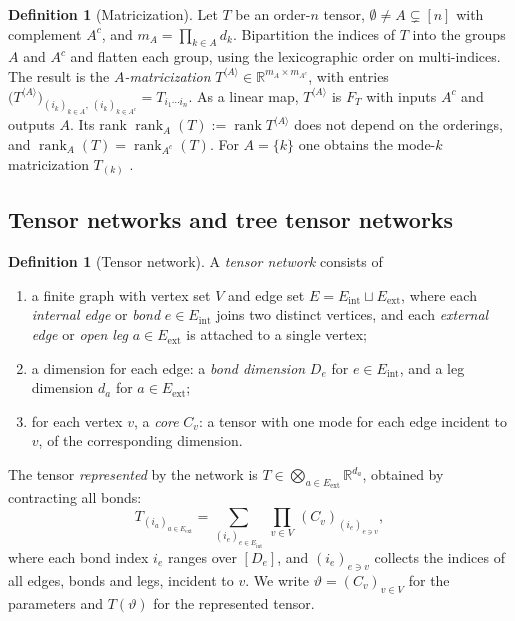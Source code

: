 \documentclass[11pt]{article}
\newcommand{\rank}{\operatorname{rank}}
\newcommand{\R}{\mathbb{R}}
\newcommand{\Eint}{E_{\mathrm{int}}}
\newcommand{\Eext}{E_{\mathrm{ext}}}
\theoremstyle{definition}
\newtheorem{definition}[theorem]{Definition}
\numberwithin{equation}{section}
\begin{document}
\begin{definition}[Matricization]\label{def:matricization}
Let $T$ be an order-$n$ tensor, $\emptyset\neq A\subsetneq[n]$ with complement $A^c$, and $m_A=\prod_{k\in A}d_k$. Bipartition the indices of $T$ into the groups $A$ and $A^c$ and flatten each group, using the lexicographic order on multi-indices. The result is the \emph{$A$-matricization} $T^{\langle A\rangle}\in\R^{m_A\times m_{A^c}}$, with entries $\big(T^{\langle A\rangle}\big)_{(i_k)_{k\in A},\,(i_k)_{k\in A^c}}=T_{i_1\cdots i_n}$. As a linear map, $T^{\langle A\rangle}$ is $F_T$ with inputs $A^c$ and outputs $A$. Its rank $\rank_A(T):=\rank T^{\langle A\rangle}$ does not depend on the orderings, and $\rank_A(T)=\rank_{A^c}(T)$. For $A=\{k\}$ one obtains the mode-$k$ matricization $T_{(k)}$ \citep{kolda2009tensor}.
\end{definition}

\subsection{Tensor networks and tree tensor networks}\label{sec:tn}

\begin{definition}[Tensor network]\label{def:tn}
A \emph{tensor network} consists of
\begin{enumerate}[label=(\roman*),nosep]
\item a finite graph with vertex set $V$ and edge set $E=\Eint\sqcup\Eext$, where each \emph{internal edge} or \emph{bond} $e\in\Eint$ joins two distinct vertices, and each \emph{external edge} or \emph{open leg} $a\in\Eext$ is attached to a single vertex;
\item a dimension for each edge: a \emph{bond dimension} $D_e$ for $e\in\Eint$, and a leg dimension $d_a$ for $a\in\Eext$;
\item for each vertex $v$, a \emph{core} $C_v$: a tensor with one mode for each edge incident to $v$, of the corresponding dimension.
\end{enumerate}
The tensor \emph{represented} by the network is $T\in\bigotimes_{a\in\Eext}\R^{d_a}$, obtained by contracting all bonds:
\begin{equation}\label{eq:contraction}
T_{(i_a)_{a\in\Eext}}=\sum_{(i_e)_{e\in\Eint}}\ \prod_{v\in V}\,(C_v)_{(i_e)_{e\ni v}},
\end{equation}
where each bond index $i_e$ ranges over $[D_e]$, and $(i_e)_{e\ni v}$ collects the indices of all edges, bonds and legs, incident to $v$. We write $\vartheta=(C_v)_{v\in V}$ for the parameters and $T(\vartheta)$ for the represented tensor.
\end{definition}
\end{document}
